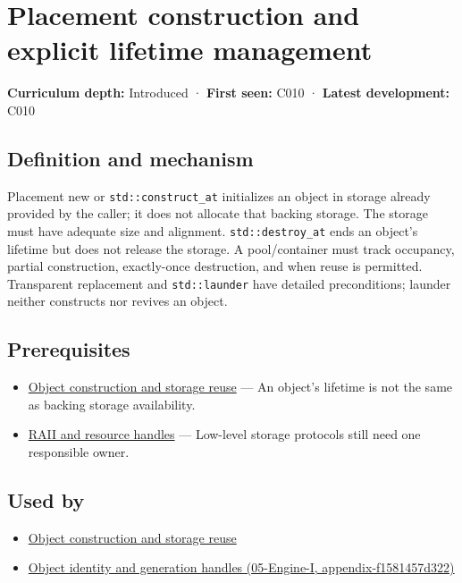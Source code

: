 \hypertarget{appendix-f56c3e43fd4e}{}
\section{Placement construction and explicit lifetime management}\label{appendix-f56c3e43fd4e-placement-construction-and-explicit-lifetime-management}

\textbf{Curriculum depth:} Introduced · \textbf{First seen:} C010 · \textbf{Latest development:} C010

\subsection{Definition and mechanism}\label{appendix-f56c3e43fd4e-definition-and-mechanism}

Placement new or \texttt{std::construct\_at} initializes an object in storage already provided by the caller; it does not allocate that backing storage. The storage must have adequate size and alignment. \texttt{std::destroy\_at} ends an object's lifetime but does not release the storage. A pool/container must track occupancy, partial construction, exactly-once destruction, and when reuse is permitted. Transparent replacement and \texttt{std::launder} have detailed preconditions; launder neither constructs nor revives an object.

\subsection{Prerequisites}\label{appendix-f56c3e43fd4e-prerequisites}

\begin{itemize}
\tightlist
\item
  \hyperref[appendix-a82f9c438857]{Object construction and storage reuse} --- An object's lifetime is not the same as backing storage availability.
\item
  \hyperref[appendix-69739d3ab49b]{RAII and resource handles} --- Low-level storage protocols still need one responsible owner.
\end{itemize}

\subsection{Used by}\label{appendix-f56c3e43fd4e-used-by}

\begin{itemize}
\tightlist
\item
  \hyperref[appendix-a82f9c438857]{Object construction and storage reuse}
\item
  \href{../05-Engine-I/main.pdf\#nameddest=appendix-f1581457d322}{Object identity and generation handles (05-Engine-I, appendix-f1581457d322)}
\end{itemize}

